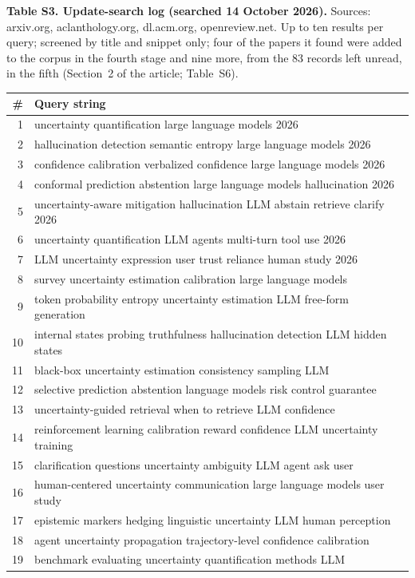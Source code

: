 \documentclass[acmsmall]{acmart}
\begin{document}
\bigskip
\noindent\textbf{Table S3. Update-search log (searched 14 October 2026).} Sources: arxiv.org, aclanthology.org, dl.acm.org, openreview.net. Up to ten results per query; screened by title and snippet only; four of the papers it found were added to the corpus in the fourth stage and nine more, from the 83 records left unread, in the fifth (Section~2 of the article; Table~S6).
\begin{center}
\small
\begin{tabular}{@{}r p{9.5cm}@{}}
\toprule
\textbf{\#} & \textbf{Query string} \\
\midrule
1 & uncertainty quantification large language models 2026 \\
2 & hallucination detection semantic entropy large language models 2026 \\
3 & confidence calibration verbalized confidence large language models 2026 \\
4 & conformal prediction abstention large language models hallucination 2026 \\
5 & uncertainty-aware mitigation hallucination LLM abstain retrieve clarify 2026 \\
6 & uncertainty quantification LLM agents multi-turn tool use 2026 \\
7 & LLM uncertainty expression user trust reliance human study 2026 \\
8 & survey uncertainty estimation calibration large language models \\
9 & token probability entropy uncertainty estimation LLM free-form generation \\
10 & internal states probing truthfulness hallucination detection LLM hidden states \\
11 & black-box uncertainty estimation consistency sampling LLM \\
12 & selective prediction abstention language models risk control guarantee \\
13 & uncertainty-guided retrieval when to retrieve LLM confidence \\
14 & reinforcement learning calibration reward confidence LLM uncertainty training \\
15 & clarification questions uncertainty ambiguity LLM agent ask user \\
16 & human-centered uncertainty communication large language models user study \\
17 & epistemic markers hedging linguistic uncertainty LLM human perception \\
18 & agent uncertainty propagation trajectory-level confidence calibration \\
19 & benchmark evaluating uncertainty quantification methods LLM \\
\bottomrule
\end{tabular}
\end{center}
\end{document}
